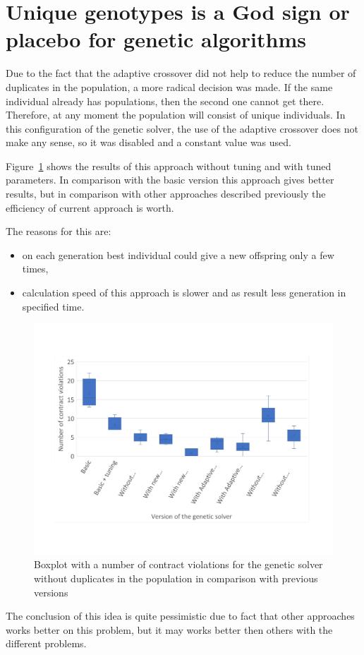 \section{Unique genotypes is a God sign or placebo for genetic algorithms}
Due to the fact that the adaptive crossover did not help to reduce the number of duplicates in the population, a more radical decision was made. If the same individual already has populations, then the second one cannot get there. Therefore, at any moment the population will consist of unique individuals. In this configuration of the genetic solver, the use of the adaptive crossover does not make any sense, so it was disabled and a constant value was used.

Figure~\ref{fig:boxplotsolverNoDuplicates} shows the results of this approach without tuning and with tuned parameters. In comparison with the basic version this approach gives better results, but in comparison with other approaches described previously the efficiency of current approach is worth.

The reasons for this are:
\begin{itemize}
	\item on each generation best individual could give a new offspring only a few times, 
	\item calculation speed of this approach is slower and as result less generation in specified time.
\end{itemize}


\begin{figure}
	\centering
	\includegraphics[width=\textwidth]{images/BoxPlotSolverNoDuplicates.pdf}
	\caption[Boxplot with a number of contract violations for the genetic solver without duplicates in the population in comparison with previous versions]{Boxplot with a number of contract violations for the genetic solver without duplicates in the population in comparison with previous versions}
	\label{fig:boxplotsolverNoDuplicates}
\end{figure}

The conclusion of this idea is quite pessimistic due to fact that other approaches works better on this problem, but it may works better then others with the different problems.
 